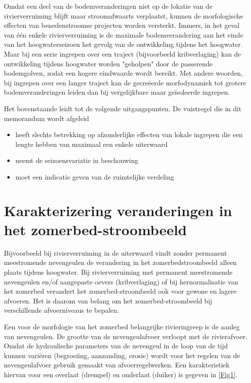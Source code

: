 Omdat een deel van de bodemveranderingen niet op de lokatie van de rivierverruiming blijft maar stroomafwaarts verplaatst, kunnen de morfologische effecten van benedenstroomse projecten worden versterkt.
Immers, in het geval van \'e\'en enkele rivierverruiming is de maximale bodemverandering aan het einde van het
hoogwaterseizoen het gevolg van de ontwikkeling tijdens het hoogwater.
Maar bij een serie ingrepen over een traject (bijvoorbeeld kribverlaging) kan de ontwikkeling tijdens hoogwater worden "geholpen" door de passerende bodemgolven, zodat een hogere eindwaarde wordt bereikt.
Met andere woorden, bij ingrepen over een langer traject kan de gecre\"eerde morfodynamiek tot grotere bodemveranderingen leiden dan bij
vergelijkbare maar ge\"isoleerde ingrepen.

Het bovenstaande leidt tot de volgende uitgangspunten.
De vuistregel die in dit memorandum wordt afgeleid

\begin{itemize}
\item heeft slechts betrekking op afzonderlijke effecten van lokale ingrepen die een lengte hebben van maximaal een enkele uiterwaard

\item neemt de seizoensvariatie in beschouwing

\item moet een indicatie geven van de ruimtelijke verdeling
\end{itemize}

\section{Karakterizering veranderingen in het zomerbed-stroombeeld}

Bijvoorbeeld bij rivierverruiming in de uiterwaard vindt zonder permanent meestromende nevengeulen de verandering in het zomerbedstroombeeld alleen plaats tijdens hoogwater.
Bij rivierverruiming met permanent meestromende nevengeulen en/of aangepaste oevers (kribverlaging) of bij hernormalisatie van het zomerbed verandert het zomerbed-stroombeeld ook voor gewone en lagere afvoeren.
Het is daarom van belang om het zomerbed-stroombeeld bij verschillende afvoerniveaus te bepalen.

Een voor de morfologie van het zomerbed belangrijke rivieringreep is de aanleg van nevengeulen.
De grootte van de nevengeulafvoer verloopt met de rivierafvoer.
Omdat de hydraulische parameters van de nevengeul in de loop van de tijd kunnen vari\"eren (begroeiing, aanzanding, erosie) wordt voor het regelen van de nevengeulafvoer gebruik gemaakt van afvoerregelwerken.
Een karakteristiek hiervan voor een overlaat (drempel) en onderlaat (duiker) is gegeven in \autoref{Fig1}.

